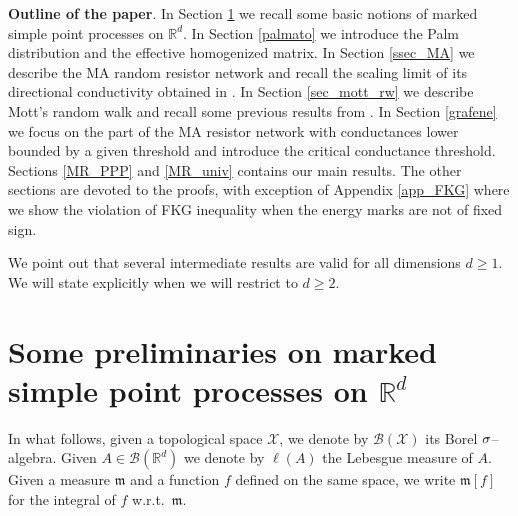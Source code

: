 \documentclass[12pt,a4paper,reqno]{amsart}
\newcommand{\cB}{\ensuremath{\mathcal B}}
\newcommand{\cX}{\ensuremath{\mathcal X}}
\newcommand{\bbP}{{\ensuremath{\mathbb P}} }
\newcommand{\bbR}{{\ensuremath{\mathbb R}} }
\let\a=\alpha \let\b=\beta   \let\d=\delta  \let\e=\varepsilon
\newcommand{\rosso}{\textcolor{black}} %
\begin{document}
{\bf Outline of the paper}.
In Section \ref{ssec_marked_SPP} we recall some basic notions of marked simple point processes on $\bbR^d$. In Section \ref{palmato} we introduce the Palm distribution 
and the effective homogenized matrix. In Section \ref{ssec_MA} we describe the MA  random resistor network  and recall the scaling limit of its directional conductivity obtained in \cite{Fhom2}. In Section \ref{sec_mott_rw} we describe  Mott's random walk and recall some previous results  from \cite{CF1,Fhom1,Fhom2,FM,FSS}. In Section \ref{grafene} we  focus on the part of the MA resistor network with conductances lower bounded by a given threshold and introduce the critical conductance threshold. Sections \ref{MR_PPP} and \ref{MR_univ} contains our main results. 
%
The other sections are devoted to the proofs, with exception of Appendix \ref{app_FKG} where we show the violation of FKG inequality when the energy marks are not of fixed sign.

We point out that several intermediate results are valid for all dimensions $d\geq 1$. We will state explicitly when we will restrict to $d\geq 2$.
%
\section{Some preliminaries on marked simple point processes on $\bbR^d$}\label{ssec_marked_SPP} 
In what follows, given a topological space $\cX$, we denote by $\cB(\cX)$ its Borel $\sigma$--algebra. 
 Given $A\in \cB(\bbR^d)$ we denote by $\ell(A)$ the Lebesgue measure of $A$. 
Given a measure $\mathfrak{m}$ and a function $f$ defined on the same space, we write $\mathfrak{m}[f]$ for the integral of $f$ w.r.t.~$\mathfrak{m}$.
\end{document}
